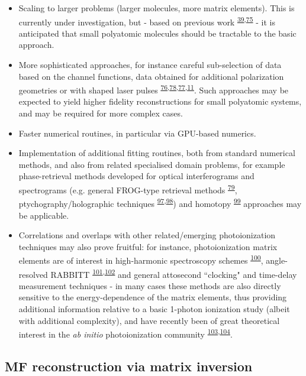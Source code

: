 \documentclass[10pt]{article}
\begin{document}
\begin{itemize}
\item Scaling to larger problems (larger molecules, more matrix elements). This is currently under investigation, but - based on previous work \textsuperscript{\hyperref[csl:39]{39},\hyperref[csl:75]{75}} - it is anticipated that small polyatomic molecules should be tractable to the basic approach. 
\item More sophisticated approaches, for instance careful sub-selection of data based on the channel functions, data obtained for additional polarization geometries or with shaped laser pulses \textsuperscript{\hyperref[csl:76]{76},\hyperref[csl:78]{78},\hyperref[csl:77]{77},\hyperref[csl:11]{11}}. Such approaches may be expected to yield higher fidelity reconstructions for small polyatomic systems, and may be required for more complex cases.
\item Faster numerical routines, in particular via GPU-based numerics.
\item Implementation of additional fitting routines, both from standard numerical methods, and also from related specialised domain problems, for example phase-retrieval methods developed for optical interferograms and spectrograms (e.g. general FROG-type retrieval methods \textsuperscript{\hyperref[csl:79]{79}}, ptychography/holographic techniques \textsuperscript{\hyperref[csl:97]{97},\hyperref[csl:98]{98}}) and homotopy \textsuperscript{\hyperref[csl:99]{99}} approaches may be applicable.
\item Correlations and overlaps with other related/emerging photoionization techniques may also prove fruitful: for instance, photoionization matrix elements are of interest in high-harmonic spectroscopy schemes \textsuperscript{\hyperref[csl:100]{100}}, angle-resolved RABBITT \textsuperscript{\hyperref[csl:101]{101},\hyperref[csl:102]{102}} and general attosecond ``clocking" and time-delay measurement techniques - in many cases these methods are also directly sensitive to the energy-dependence of the matrix elements, thus providing additional information relative to a basic 1-photon ionization study (albeit with additional complexity), and have recently been of great theoretical interest in the \textit{ab initio} photoionization community \textsuperscript{\hyperref[csl:103]{103},\hyperref[csl:104]{104}}.

\end{itemize}


\subsection{MF reconstruction via matrix inversion\label{sec:Matrix-inversion-example}}
\end{document}
